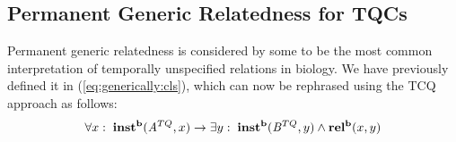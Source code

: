 %

%





\subsection*{Permanent Generic Relatedness for TQCs}
Permanent generic relatedness is considered by some to be the most common
interpretation of temporally unspecified relations in biology. We have
previously defined it in (\ref{eq:generically:cls}), which can
now be rephrased using the TCQ approach as follows:
\begin{equation}
\forall x:\; \mathrm{\mathbf{inst^b}}(\mathit{A}^{TQ},x) \rightarrow \exists y :\;
\mathrm{\mathbf{inst^b}}(\mathit{B}^{TQ}, y) \wedge \mathrm{\mathbf{rel^b}}(x,y)
\label{eq:tqc:pg}
\end{equation}

